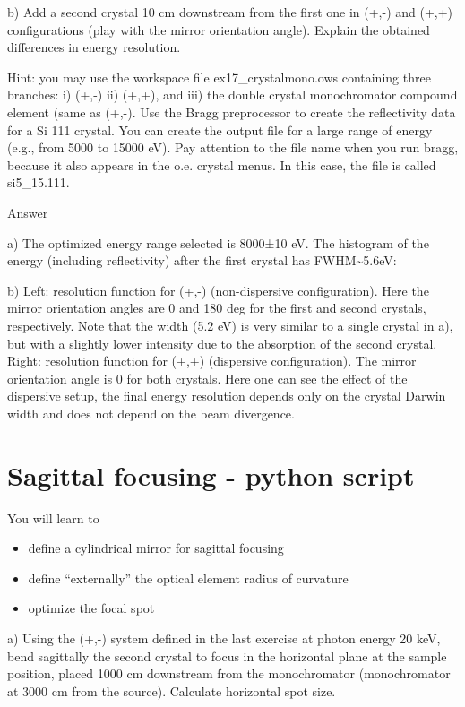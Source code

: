 \documentclass[]{article}
\providecommand{\tightlist}{%
  \setlength{\itemsep}{0pt}\setlength{\parskip}{0pt}}
\begin{document}
b) Add a second crystal 10 cm downstream from the first one in (+,-) and
(+,+) configurations (play with the mirror orientation angle). Explain
the obtained differences in energy resolution.

Hint: you may use the workspace file ex17\_crystalmono.ows containing
three branches: i) (+,-) ii) (+,+), and iii) the double crystal
monochromator compound element (same as (+,-). Use the Bragg
preprocessor to create the reflectivity data for a Si 111 crystal. You
can create the output file for a large range of energy (e.g., from 5000
to 15000 eV). Pay attention to the file name when you run bragg, because
it also appears in the o.e. crystal menus. In this case, the file is
called si5\_15.111.

Answer

a) The optimized energy range selected is 8000±10 eV. The histogram of
the energy (including reflectivity) after the first crystal has
FWHM\textasciitilde{}5.6eV:

b) Left: resolution function for (+,-) (non-dispersive configuration).
Here the mirror orientation angles are 0 and 180 deg for the first and
second crystals, respectively. Note that the width (5.2 eV) is very
similar to a single crystal in a), but with a slightly lower intensity
due to the absorption of the second crystal. Right: resolution function
for (+,+) (dispersive configuration). The mirror orientation angle is 0
for both crystals. Here one can see the effect of the dispersive setup,
the final energy resolution depends only on the crystal Darwin width and
does not depend on the beam divergence.

\section{Sagittal focusing - python
script}\label{sagittal-focusing---python-script}

You will learn to

\begin{itemize}
\tightlist
\item
  define a cylindrical mirror for sagittal focusing
\item
  define ``externally'' the optical element radius of curvature
\item
  optimize the focal spot
\end{itemize}

a) Using the (+,-) system defined in the last exercise at photon energy
20 keV, bend sagittally the second crystal to focus in the horizontal
plane at the sample position, placed 1000 cm downstream from the
monochromator (monochromator at 3000 cm from the source). Calculate
horizontal spot size.
\end{document}
